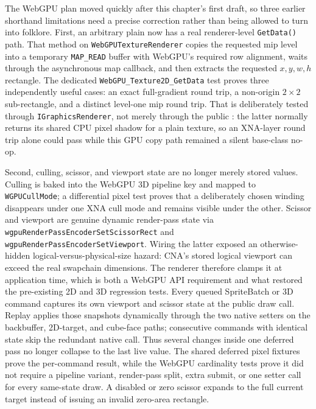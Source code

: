The WebGPU plan moved quickly after this chapter's first draft, so three earlier shorthand
limitations need a precise correction rather than being allowed to turn into folklore. First,
an arbitrary plain  now has a real renderer-level \texttt{GetData()} path.
That method on \texttt{WebGPUTextureRenderer} copies the requested mip level into a temporary
\texttt{MAP\_READ} buffer with WebGPU's required row alignment, waits through the asynchronous
map callback, and then extracts the requested $x,y,w,h$ rectangle. The dedicated
\texttt{WebGPU\_Texture2D\_GetData} test proves three independently useful cases: an exact
full-gradient round trip, a non-origin $2\times2$ sub-rectangle, and a distinct level-one mip
round trip. That is deliberately tested through \texttt{IGraphicsRenderer}, not merely through
the public : the latter normally returns its shared CPU pixel shadow for a
plain texture, so an XNA-layer round trip alone could pass while this GPU copy path remained a
silent base-class no-op.

Second, culling, scissor, and viewport state are no longer merely stored values. Culling is
baked into the WebGPU 3D pipeline key and mapped to \texttt{WGPUCullMode}; a differential
pixel test proves that a deliberately chosen winding disappears under one XNA cull mode and
remains visible under the other. Scissor and viewport are genuine dynamic render-pass state via
\texttt{wgpuRenderPassEncoderSetScissorRect} and
\texttt{wgpuRenderPassEncoderSetViewport}. Wiring the latter exposed an otherwise-hidden
logical-versus-physical-size hazard: CNA's stored logical viewport can exceed the real
swapchain dimensions. The renderer therefore clamps it at application time, which is both a
WebGPU API requirement and what restored the pre-existing 2D and 3D regression tests.
Every queued SpriteBatch or 3D command captures its own viewport and scissor state at the public
draw call. Replay applies those snapshots dynamically through the two native setters on the
backbuffer, 2D-target, and cube-face paths; consecutive commands with identical state skip the
redundant native call. Thus several changes inside one deferred pass no longer collapse to the
last live value. The shared deferred pixel fixtures prove the per-command result, while the
WebGPU cardinality tests prove it did not require a pipeline variant, render-pass split, extra
submit, or one setter call for every same-state draw. A disabled or zero scissor expands to the
full current target instead of issuing an invalid zero-area rectangle.

